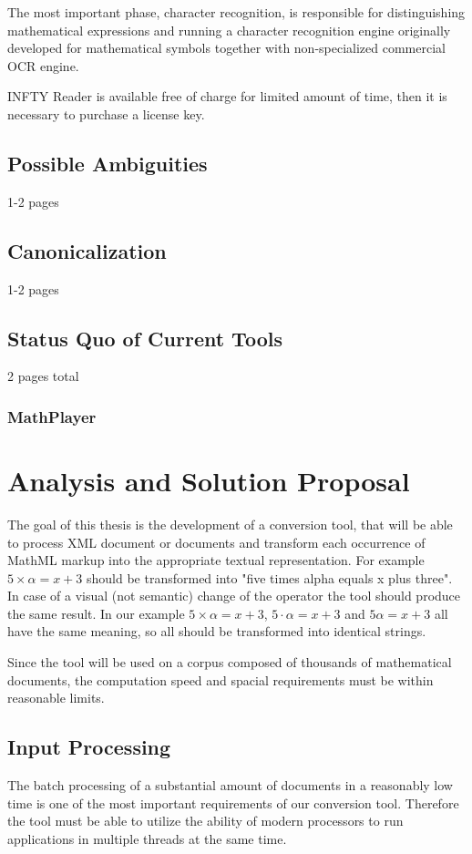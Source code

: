 \documentclass[11pt,oneside,final]{fithesis2}
\begin{document}
The most important phase, character recognition, is responsible for distinguishing mathematical expressions and running a character recognition engine originally developed for mathematical symbols together with non-specialized commercial OCR engine. 

INFTY Reader is available free of charge for limited amount of time, then it is necessary to purchase a license key.

\section{Possible Ambiguities}
1-2 pages

\section{Canonicalization}
1-2 pages
\section{Status Quo of Current Tools}
2 pages total
\subsection{MathPlayer}

\chapter{Analysis and Solution Proposal}
The goal of this thesis is the development of a conversion tool, that will be able to process XML document or documents and transform each occurrence of MathML markup into the appropriate textual representation. For example $5 \times \alpha = x + 3$ should be transformed into "five times alpha equals x plus three". In case of a visual (not semantic) change of the operator the tool should produce the same result. In our example $5 \times \alpha = x + 3$, $5 \cdot \alpha = x + 3$ and $5\alpha = x + 3$ all have the same meaning, so all should be transformed into identical strings.

Since the tool will be used on a corpus composed of thousands of mathematical documents, the computation speed and spacial requirements must be within reasonable limits. 


\section{Input Processing}
The batch processing of a substantial amount of documents in a reasonably low time is one of the most important requirements of our conversion tool. Therefore the tool must be able to utilize the ability of modern processors to run applications in multiple threads at the same time. 
\end{document}
